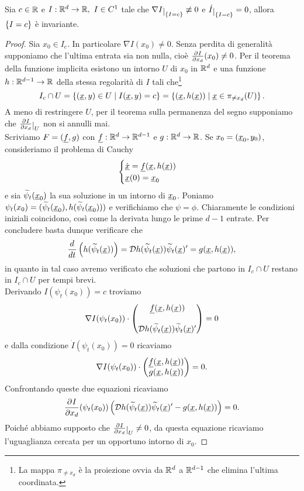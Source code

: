 \begin{proposition}\label{CostruzioneInsiemiInvariantiCurveDiLivello}
Sia $c\in\mathbb{R}$ e $I:\mathbb{R}^d\to \mathbb{R},\ I\in C^1$ tale che $\nabla I\res{\cpa{I=c}}\not\equiv 0$ e $\dot I\res{\cpa{I=c}}=0$, allora $\left\{{I=c}\right\}$ \`e invariante.
\end{proposition}
\begin{proof}
Sia $x_0\in I_c$. In particolare $\nabla I(x_0)\neq 0$. Senza perdita di generalit\`a supponiamo che l'ultima entrata sia non nulla, cio\`e $\pp{x_d}I(x_0)\neq 0$. Per il teorema della funzione implicita esistono un intorno $U$ di $x_0$ in $\mathbb{R}^d$ e una funzione $h:\mathbb{R}^{d-1}\to \mathbb{R}$ della stessa regolarit\`a di $I$ tali che\footnote{La mappa $\pi_{\neq x_d}$ \`e la proiezione ovvia da $\mathbb{R}^d$ a $\mathbb{R}^{d-1}$ che elimina l'ultima coordinata.}
\[I_c\cap U=\left\{{({\underline{x}},y)\in U\mid I({\underline{x}}, y)=c}\right\}=\left\{{({\underline{x}},h({\underline{x}}))\mid {\underline{x}}\in \pi_{\neq x_d}(U)}\right\}.\]
A meno di restringere $U$, per il teorema sulla permanenza del segno supponiamo che $\pp{x_d}I\res{U}$ non si annulli mai.\\
Scriviamo $F=({\underline{f}},g)$ con ${\underline{f}}:\mathbb{R}^d\to \mathbb{R}^{d-1}$ e $g:\mathbb{R}^d\to\mathbb{R}$. Se $x_0=({\underline{x}}_0,y_0)$, consideriamo il problema di Cauchy
\[\begin{cases}
\dot {{\underline{x}}}={\underline{f}}({\underline{x}},h({\underline{x}}))\\
{\underline{x}}(0)={\underline{x}}_0
\end{cases}\]
e sia $\widetilde{\psi}_t({\underline{x}}_0)$ la sua soluzione in un intorno di ${\underline{x}}_0$. Poniamo $\psi_t(x_0)=(\widetilde{\psi}_t({\underline{x}}_0),h(\widetilde{\psi}_t({\underline{x}}_0)))$ e verifichiamo che $\psi=\phi$. Chiaramente le condizioni iniziali coincidono, cos\`i come la derivata lungo le prime $d-1$ entrate. 
Per concludere basta dunque verificare che 
\[\dd t{}\pa{h(\wt \psi_t(\ulx))}=\Dc h(\wt\psi_t(\ulx))\wt\psi_t(\ulx)'=g(\ulx,h(\ulx)),\]
in quanto in tal caso avremo verificato che soluzioni che partono in $I_c\cap U$ restano in $I_c\cap U$ per tempi brevi.\\
Derivando $I(\psi_t(x_0))=c$ troviamo 
\[\nabla I(\psi_t(x_0))\cdot \begin{pmatrix}{\underline{f}}({\underline{x}},h({\underline{x}}))\\\\\mathcal{D} h(\widetilde{\psi}_t({\underline{x}}))\widetilde{\psi}_t({\underline{x}})'\end{pmatrix}=0\]
e dalla condizione $\dot I(\psi_t(x_0))=0$ ricaviamo
\[\nabla I(\psi_t(x_0))\cdot \begin{pmatrix}{\underline{f}}({\underline{x}},h({\underline{x}}))\\g({\underline{x}},h({\underline{x}}))\end{pmatrix}=0.\]
Confrontando queste due equazioni ricaviamo
\[\pp{x_d}I(\psi_t(x_0))\pa{\Dc h(\wt\psi_t(\ulx))\wt\psi_t(\ulx)'-g(\ulx,h(\ulx))}=0.\]
Poich\'e abbiamo supposto che $\pp{x_d}I\res{U}\neq 0$, da questa equazione ricaviamo l'uguaglianza cercata per un opportuno intorno di $x_0$.
\end{proof}

